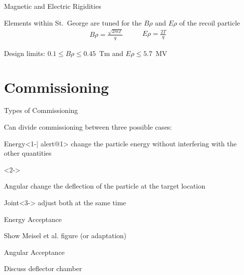 \documentclass[10pt]{beamer}
\begin{document}
\begin{frame}[fragile]{Magnetic and Electric Rigidities}

    Elements within St.\ George are tuned for the $B\rho$ and $E\rho$ of
    the recoil particle
    \[
        \begin{split}
            B\rho = \frac{\sqrt{2mT}}{q}
        \end{split}
        \quad\quad
        \begin{split}
            E\rho = \frac{2T}{q}
        \end{split}
    \]

    Design limits: $0.1 \leq B\rho \leq 0.45$~Tm and $E\rho \leq 5.7$~MV

\end{frame}

\section{Commissioning}

\begin{frame}[fragile]{Types of Commissioning}

    Can divide commissioning between three possible cases:

    \begin{alertblock}{Energy}<1-| alert@1>
        change the particle energy without interfering with the other
        quantities
    \end{alertblock}<2->
    \begin{alertblock}{Angular}
        change the deflection of the particle at the target location
    \end{alertblock}
    \begin{alertblock}{Joint}<3->
        adjust both at the same time
    \end{alertblock}

\end{frame}

\begin{frame}[fragile]{Energy Acceptance}

    Show Meisel et al. figure (or adaptation)

\end{frame}

\begin{frame}[fragile]{Angular Acceptance}

    Discuss deflector chamber

\end{frame}
\end{document}
